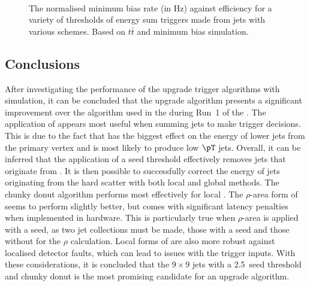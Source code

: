 \begin{figure}
  \centering
  ~
  \caption{ The normalised minimum bias rate (in Hz) against efficiency for a
  variety of thresholds of energy sum
  triggers made from jets with various \PUS schemes. Based on
  $t\bar{t}$ and minimum bias \MC simulation.}
  \label{fig:rateEffJet}
\end{figure}

\subsection{Conclusions}

After investigating the performance of the upgrade trigger algorithms
with simulation, it can be concluded that the upgrade algorithm
presents a significant improvement over the algorithm used in the \GCT
during Run~1 of the \LHC. The application of \PUS appears most useful
when summing jets to make trigger decisions. This is due to the fact
that \PU has the biggest effect on the energy of lower \pT jets from
the primary vertex and is most likely to produce low $\pT$ jets.
Overall, it can be inferred that the application of a seed threshold
effectively removes jets that originate from \PU. It is then possible
to successfully correct the energy of jets originating from the hard
scatter with both local and global \PUS methods. The chunky donut
algorithm performs most effectively for local \PUS. The $\rho$-area
form of \PUS seems to perform slightly better, but comes with
significant latency penalties when implemented in hardware. This is
particularly true when $\rho$-area \PUS is applied with a seed, as two
jet collections must be made, those with a seed and those without for
the $\rho$ calculation. Local forms of \PUS are also more robust
against localised detector faults, which can lead to issues with the
trigger inputs. With these considerations, it is concluded that the
$9\times9$ \TT jets with a 2.5~\gev seed threshold and chunky donut
\PUS is the most promising candidate for an upgrade algorithm. 

